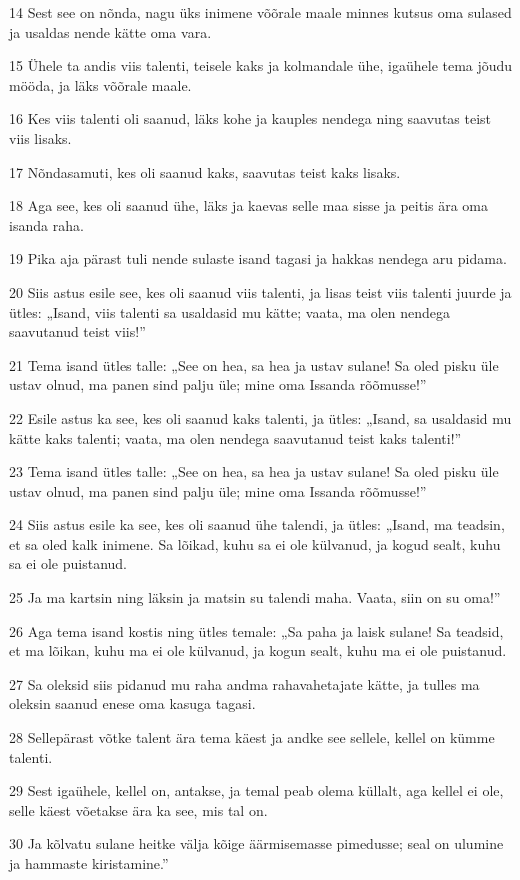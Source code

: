 \par 14 Sest see on nõnda, nagu üks inimene võõrale maale minnes kutsus oma sulased ja usaldas nende kätte oma vara.
\par 15 Ühele ta andis viis talenti, teisele kaks ja kolmandale ühe, igaühele tema jõudu mööda, ja läks võõrale maale.
\par 16 Kes viis talenti oli saanud, läks kohe ja kauples nendega ning saavutas teist viis lisaks.
\par 17 Nõndasamuti, kes oli saanud kaks, saavutas teist kaks lisaks.
\par 18 Aga see, kes oli saanud ühe, läks ja kaevas selle maa sisse ja peitis ära oma isanda raha.
\par 19 Pika aja pärast tuli nende sulaste isand tagasi ja hakkas nendega aru pidama.
\par 20 Siis astus esile see, kes oli saanud viis talenti, ja lisas teist viis talenti juurde ja ütles: „Isand, viis talenti sa usaldasid mu kätte; vaata, ma olen nendega saavutanud teist viis!”
\par 21 Tema isand ütles talle: „See on hea, sa hea ja ustav sulane! Sa oled pisku üle ustav olnud, ma panen sind palju üle; mine oma Issanda rõõmusse!”
\par 22 Esile astus ka see, kes oli saanud kaks talenti, ja ütles: „Isand, sa usaldasid mu kätte kaks talenti; vaata, ma olen nendega saavutanud teist kaks talenti!”
\par 23 Tema isand ütles talle: „See on hea, sa hea ja ustav sulane! Sa oled pisku üle ustav olnud, ma panen sind palju üle; mine oma Issanda rõõmusse!”
\par 24 Siis astus esile ka see, kes oli saanud ühe talendi, ja ütles: „Isand, ma teadsin, et sa oled kalk inimene. Sa lõikad, kuhu sa ei ole külvanud, ja kogud sealt, kuhu sa ei ole puistanud.
\par 25 Ja ma kartsin ning läksin ja matsin su talendi maha. Vaata, siin on su oma!”
\par 26 Aga tema isand kostis ning ütles temale: „Sa paha ja laisk sulane! Sa teadsid, et ma lõikan, kuhu ma ei ole külvanud, ja kogun sealt, kuhu ma ei ole puistanud.
\par 27 Sa oleksid siis pidanud mu raha andma rahavahetajate kätte, ja tulles ma oleksin saanud enese oma kasuga tagasi.
\par 28 Sellepärast võtke talent ära tema käest ja andke see sellele, kellel on kümme talenti.
\par 29 Sest igaühele, kellel on, antakse, ja temal peab olema küllalt, aga kellel ei ole, selle käest võetakse ära ka see, mis tal on.
\par 30 Ja kõlvatu sulane heitke välja kõige äärmisemasse pimedusse; seal on ulumine ja hammaste kiristamine.”

